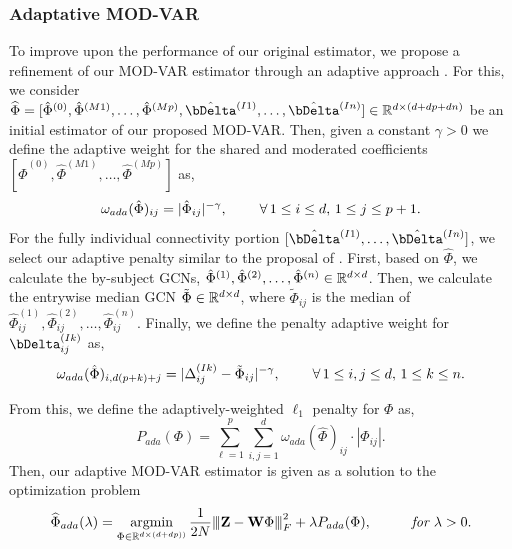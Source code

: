 \subsubsection{Adaptative MOD-VAR}


To improve upon the performance of our original estimator, we propose a refinement of our MOD-VAR estimator through an adaptive approach \citep{zou2006adaptive}. For this, we consider  $\bhat{\Phi}= [\hat{\Phi}^{(0)}, \hat{\Phi}^{(M1)}, \ldots ,\hat{\Phi}^{(Mp)}, \hat{\bDelta}^{(I1)},\ldots , \hat{\bDelta}^{(In)}]\in\bbR^{d\times (d+dp+dn)}$ be an initial estimator of our proposed MOD-VAR. Then, given a constant $\gamma > 0$ we define the adaptive weight for the shared and moderated coefficients $[\hat{\Phi}^{(0)}, \hat{\Phi}^{(M1)}, \ldots ,\hat{\Phi}^{(Mp)}]$ as,
\begin{equation*}
	\omega_{ada}(\hat\Phi)_{ij}  = 
		|\hat\Phi_{ij}|^{-\gamma}, \hspace{8mm}\forall\, 1\leq i\leq d,\, 1\leq j \leq p+1.
\end{equation*}
For the fully individual connectivity portion $[\hat{\bDelta}^{(I1)},\ldots , \hat{\bDelta}^{(In)}]$, we select our adaptive penalty similar to the proposal of \citet{fisher2024structured}. First, based on $\hat{\Phi}$, we calculate the by-subject GCNs, $\hat{\Phi}^{(1)},\hat{\Phi}^{(2)},\ldots, \hat{\Phi}^{(n)}\in\mathbb{R}^{d\times d}$. Then, we calculate the entrywise median GCN $\tilde{\Phi}\in\mathbb{R}^{d\times d}$, where $\tilde{\Phi}_{ij}$ is the median of $\hat{\Phi}^{(1)}_{ij},\hat{\Phi}^{(2)}_{ij},\ldots, \hat{\Phi}^{(n)}_{ij}$. Finally, we define the penalty adaptive weight for $\bDelta^{(Ik)}_{ij}$ as,
\begin{equation*}
	\omega_{ada}(\hat\Phi)_{i,d(p+k)+j}  = 
	|\Delta^{(Ik)}_{ij} - \tilde{\Phi}_{ij}|^{-\gamma}, \hspace{8mm}\forall\, 1\leq i,j\leq d,\, 1\leq k \leq n.
\end{equation*}


From this, we define the adaptively-weighted $\ell_1$ penalty for $\Phi$ as,
\begin{equation}
	P_{ada}(\Phi)  = \sum_{\ell = 1}^{p}\sum_{i, j=1}^{d} \omega_{ada}(\hat\Phi)_{ij}\cdot |\Phi_{ij}|.
\end{equation}
Then, our adaptive MOD-VAR estimator is given as a solution to the optimization problem
\begin{equation*}\label{eq:rvar_opt}
	\bhat\Phi_{ada}(\lambda) = \argmin_{\Phi \in \bbR^{d \times (d+dp))}} \frac{1}{2N}\vertiii{ \Zb - \Wb \Phi }_{F}^2 + \lambda P_{ada}(\Phi), \hspace{10mm} \textit{for } \lambda > 0 . 
\end{equation*}



